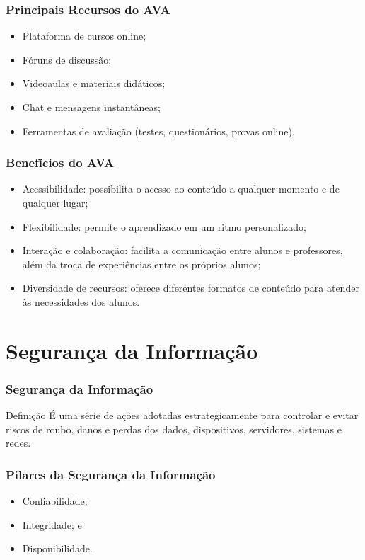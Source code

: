 \documentclass[aspectratio=169]{beamer} %
\begin{document}
\begin{frame}
	\frametitle{Principais Recursos do AVA}
	
	\begin{itemize}
		\item Plataforma de cursos online;
		\item Fóruns de discussão;
		\item Videoaulas e materiais didáticos;
		\item Chat e mensagens instantâneas;
		\item Ferramentas de avaliação (testes, questionários, provas online).
	\end{itemize}
\end{frame}

\begin{frame}
	\frametitle{Benefícios do AVA}
	
	\begin{itemize}
		\item Acessibilidade: possibilita o acesso ao conteúdo a qualquer momento e de qualquer lugar;
		\item Flexibilidade: permite o aprendizado em um ritmo personalizado;
		\item Interação e colaboração: facilita a comunicação entre alunos e professores, além da troca de experiências entre os próprios alunos;
		\item Diversidade de recursos: oferece diferentes formatos de conteúdo para atender às necessidades dos alunos.
	\end{itemize}
\end{frame}

\section{Segurança da Informação}

\begin{frame}
	\frametitle{Segurança da Informação}
	
	\begin{block}{Definição}
		 É uma série de ações adotadas estrategicamente para controlar e evitar riscos de roubo, danos e perdas dos dados, dispositivos, servidores, sistemas e redes.
	\end{block}
\end{frame}

\begin{frame}
	\frametitle{Pilares da Segurança da Informação}

	\begin{itemize}
		\item Confiabilidade;
		\item Integridade; e
		\item Disponibilidade.
	\end{itemize}
\end{frame}
\end{document}
